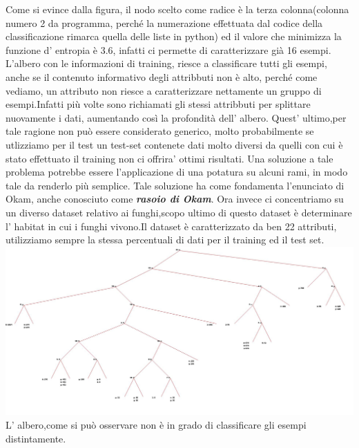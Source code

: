 		 Come si evince dalla figura, il nodo scelto come radice è la terza colonna(colonna numero 2 da programma, perché la numerazione effettuata dal codice della classificazione rimarca quella delle liste in python) ed il valore che  minimizza la funzione d' entropia è 3.6, infatti ci permette di caratterizzare già 16 esempi.
		  L'albero con le informazioni di training, riesce a classificare tutti gli esempi, anche se il contenuto informativo degli attribbuti non è alto, perché come vediamo, un attributo non riesce a caratterizzare nettamente un gruppo di esempi.Infatti più volte sono richiamati gli stessi attribbuti per splittare nuovamente i dati, aumentando così la profondità dell' albero. \newline Quest' ultimo,per tale ragione non può essere considerato generico, molto probabilmente se utlizziamo per il test un test-set contenete dati molto diversi da quelli con cui è stato effettuato il training non ci offrira' ottimi risultati. 
		  \newline Una soluzione a tale problema potrebbe essere l'applicazione di una potatura su alcuni rami, in modo tale da renderlo più semplice.
		  \newline Tale soluzione ha come fondamenta l'enunciato di Okam, anche conosciuto come  \textbf{\textit{rasoio di Okam}}.
		\newline
		\newline
		Ora invece ci concentriamo su un diverso dataset relativo ai funghi,scopo ultimo di questo dataset è determinare l' habitat in cui i funghi vivono.Il dataset è caratterizzato da ben 22 attributi, utilizziamo sempre la stessa percentuali di dati per il training ed il test set.
		\includegraphics[width=.9\textwidth, height=0.63\textheight]{mushroom.jpg}		
		\newline L' albero,come si può osservare non è in grado di classificare gli esempi distintamente.
